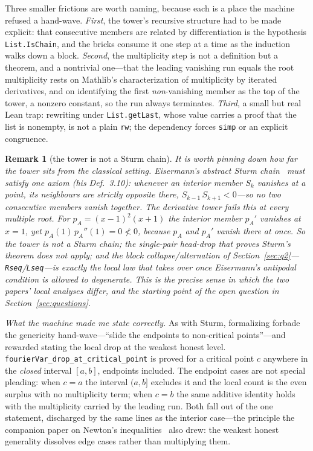 \documentclass[11pt]{article}
\newtheorem{remark}{Remark}
\newcommand{\lean}[1]{\texttt{#1}}
\begin{document}
Three smaller frictions are worth naming, because each is a place the machine refused a hand-wave.
\emph{First}, the tower's recursive structure had to be made explicit: that consecutive members are
related by differentiation is the hypothesis \lean{List.IsChain}, and the bricks consume it one step
at a time as the induction walks down a block. \emph{Second}, the multiplicity step is not a
definition but a theorem, and a nontrivial one---that the leading vanishing run equals the root
multiplicity rests on Mathlib's characterization of multiplicity by iterated derivatives, and on
identifying the first \emph{non}-vanishing member as the top of the tower, a nonzero constant, so the
run always terminates. \emph{Third}, a small but real Lean trap: rewriting under \lean{List.getLast},
whose value carries a proof that the list is nonempty, is not a plain \lean{rw}; the dependency forces
\lean{simp} or an explicit congruence.

\begin{remark}[the tower is not a Sturm chain]\label{rem:notsturm}
It is worth pinning down how far the tower sits from the classical setting. Eisermann's abstract
\emph{Sturm chain}~\cite{eisermann} must satisfy one axiom (his Def.~3.10): whenever an \emph{interior}
member $S_k$ vanishes at a point, its neighbours are strictly opposite there, $S_{k-1}\,S_{k+1}<0$---so
no two consecutive members vanish together. The derivative tower fails this at every multiple root. For
$p_A=(x-1)^2(x+1)$ the interior member $p_A'$ vanishes at $x=1$, yet $p_A(1)\,p_A''(1)=0\not<0$, because
$p_A$ and $p_A'$ vanish there \emph{at once}. So the tower is not a Sturm chain; the single-pair
head-drop that proves Sturm's theorem does not apply; and the block collapse/alternation of
Section~\ref{sec:q2}---\lean{Rseq}/\lean{Lseq}---is exactly the local law that takes over once
Eisermann's antipodal condition is allowed to degenerate. This is the precise sense in which the two
papers' local analyses differ, and the starting point of the open question in
Section~\ref{sec:questions}.
\end{remark}

\emph{What the machine made me state correctly.} As with Sturm, formalizing forbade the genericity
hand-wave---``slide the endpoints to non-critical points''---and rewarded stating the local drop at
the weakest honest level. \lean{fourierVar\_drop\_at\_critical\_point} is proved for a critical point
$c$ anywhere in the \emph{closed} interval $[a,b]$, endpoints included. The endpoint cases are not
special pleading: when $c=a$ the interval $(a,b]$ excludes it and the local count is the even surplus
with no multiplicity term; when $c=b$ the same additive identity holds with the multiplicity carried
by the leading run. Both fall out of the one statement, discharged by the same lines as the interior
case---the principle the companion paper on Newton's inequalities~\cite{newton} also drew: the
weakest honest generality dissolves edge cases rather than multiplying them.
\end{document}
